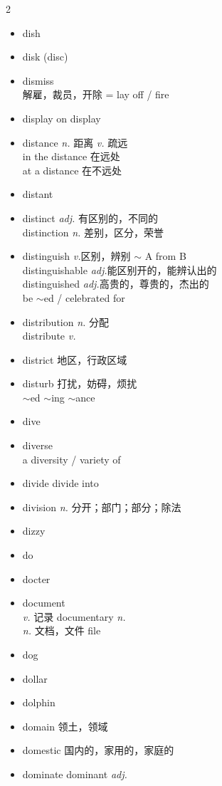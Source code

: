 \documentclass[../../book.tex]{subfiles}
\begin{document}
\begin{multicols}{2}
\begin{itemize}
\item[-] dish
\item[-] disk (disc)
\item[-] dismiss
\\解雇，裁员，开除 = lay off / fire
\item[-] display \phantom{a} on display
\item[-] distance \emph{n.} 距离 \emph{v.} 疏远
\\in the distance 在远处
\\at a distance 在不远处
\item[-] distant
\item[-] distinct \emph{adj.} 有区别的，不同的
\\distinction \emph{n.} 差别，区分，荣誉
\item[-] distinguish \emph{v.}区别，辨别 $\sim$ A from B
\\distinguishable \emph{adj.}能区别开的，能辨认出的
\\distinguished \emph{adj.}高贵的，尊贵的，杰出的
\\be $\sim$ed / celebrated for
\item[-] distribution \emph{n.} 分配
\\distribute \emph{v.}
\item[-] district 地区，行政区域
\item[-] disturb 打扰，妨碍，烦扰
\\$\sim$ed $\sim$ing $\sim$ance
\item[-] dive
\item[-] diverse
\\a diversity / variety of
\item[-] divide \phantom{a} divide into
\item[-] division \emph{n.} 分开；部门；部分；除法
\item[-] dizzy
\item[-] do
\item[-] docter
\item[-] document
\\\emph{v.} 记录 \phantom{a} documentary \emph{n.}
\\\emph{n.} 文档，文件 file
\item[-] dog
\item[-] dollar
\item[-] dolphin
\item[-] domain 领土，领域
\item[-] domestic 国内的，家用的，家庭的
\item[-] dominate \phantom{a} dominant \emph{adj.}

\end{itemize}
\end{multicols}
\end{document}
